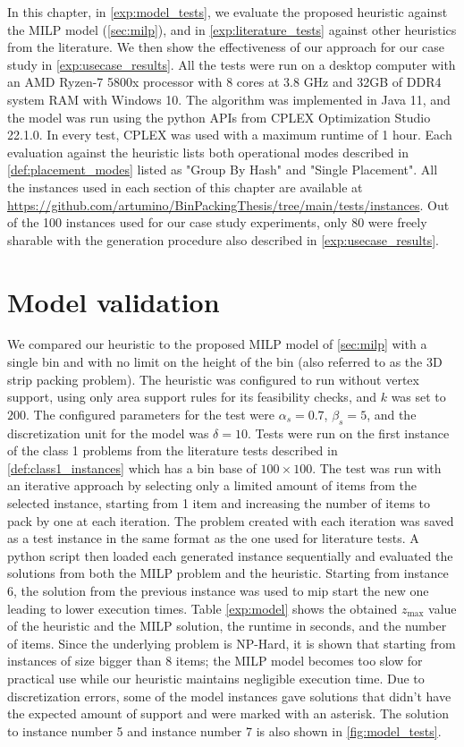 In this chapter, in \cref{exp:model_tests}, we evaluate the proposed heuristic against the MILP model (\ref{sec:milp}), and in \cref{exp:literature_tests} against other heuristics from the literature. We then show the effectiveness of our approach for our case study in \cref{exp:usecase_results}.
All the tests were run on a desktop computer with an AMD Ryzen-7 5800x processor with 8 cores at 3.8 GHz and 32GB of DDR4 system RAM with Windows 10. The algorithm was implemented in Java 11, and the model was run using the python APIs from CPLEX Optimization Studio 22.1.0.
In every test, CPLEX was used with a maximum runtime of 1 hour.
Each evaluation against the heuristic lists both operational modes described in \cref{def:placement_modes} listed as "Group By Hash" and "Single Placement".
All the instances used in each section of this chapter are available at \url{https://github.com/artumino/BinPackingThesis/tree/main/tests/instances}.
Out of the 100 instances used for our case study experiments, only 80 were freely sharable with the generation procedure also described in \cref{exp:usecase_results}.

\section{Model validation}
We compared our heuristic to the proposed MILP model of \cref{sec:milp} with a single bin and with no limit on the height of the bin (also referred to as the 3D strip packing problem).
The heuristic was configured to run without vertex support, using only area support rules for its feasibility checks, and $k$ was set to $200$.
The configured parameters for the test were $\alpha_s = 0.7$, $\beta_s = 5$, and the discretization unit for the model was $\delta = 10$. 
Tests were run on the first instance of the class 1 problems from the literature tests described in \cref{def:class1_instances} which has a bin base of $100 \times 100$.
The test was run with an iterative approach by selecting only a limited amount of items from the selected instance, starting from 1 item and increasing the number of items to pack by one at each iteration.
The problem created with each iteration was saved as a test instance in the same format as the one used for literature tests. A python script then loaded each generated instance sequentially and evaluated the solutions from both the MILP problem and the heuristic.
Starting from instance 6, the solution from the previous instance was used to mip start the new one leading to lower execution times.
Table \ref{exp:model} shows the obtained $z_{\text{max}}$ value of the heuristic and the MILP solution, the runtime in seconds, and the number of items.
Since the underlying problem is NP-Hard, it is shown that starting from instances of size bigger than 8 items; the MILP model becomes too slow for practical use while our heuristic maintains negligible execution time.
Due to discretization errors, some of the model instances gave solutions that didn't have the expected amount of support and were marked with an asterisk.
The solution to instance number 5 and instance number 7 is also shown in \cref{fig:model_tests}.
\label{exp:model_tests}



